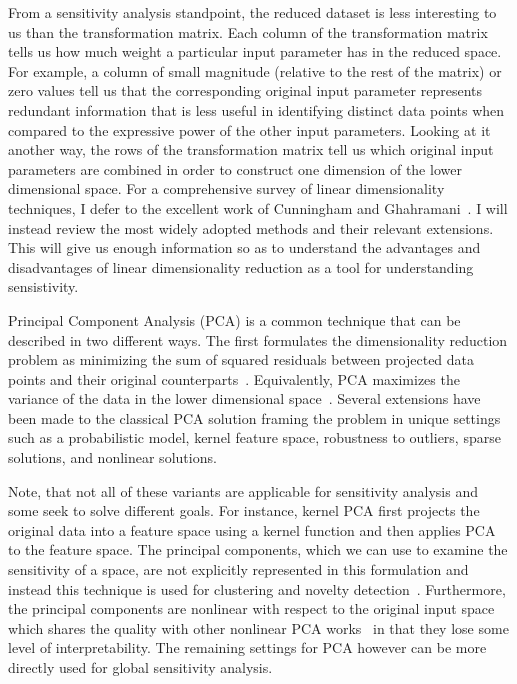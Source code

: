 From a sensitivity analysis standpoint, the reduced dataset is less interesting to us than the transformation matrix.
%
Each column of the transformation matrix tells us how much weight a particular input parameter has in the reduced space.
%
For example, a column of small magnitude (relative to the rest of the matrix) or zero values tell us that the corresponding original input parameter represents redundant information that is less useful in identifying distinct data points when compared to the expressive power of the other input parameters.
%
Looking at it another way, the rows of the transformation matrix tell us which original input parameters are combined in order to construct one dimension of the lower dimensional space.
%
For a comprehensive survey of linear dimensionality techniques, I defer to the excellent work of Cunningham and Ghahramani~\cite{CunninghamGhahramani2015}.
%
I will instead review the most widely adopted methods and their relevant extensions.
%
This will give us enough information so as to understand the advantages and disadvantages of linear dimensionality reduction as a tool for understanding sensistivity.

Principal Component Analysis (PCA) is a common technique that can be described in two different ways.
%
The first formulates the dimensionality reduction problem as minimizing the sum of squared residuals between projected data points and their original counterparts~\cite{Pearson1901}.
%
Equivalently, PCA maximizes the variance of the data in the lower dimensional space~\cite{Hotelling1933}.
%
Several extensions have been made to the classical PCA solution framing the problem in unique settings such as a probabilistic model, kernel feature space, robustness to outliers, sparse solutions, and nonlinear solutions.

Note, that not all of these variants are applicable for sensitivity analysis and some seek to solve different goals.
%
For instance, kernel PCA first projects the original data into a feature space using a kernel function and then applies PCA to the feature space.
%
The principal components, which we can use to examine the sensitivity of a space, are not explicitly represented in this formulation and instead this technique is used for clustering and novelty detection~\cite{ScholkopfSmolaMuller1997}.
%
Furthermore, the principal components are nonlinear with respect to the original input space~\cite{BishopNasrabadi2006} which shares the quality with other nonlinear PCA works~\cite{CollinsDasguptaSchapire2001,MohamedGhahramaniHeller2009,HyvarinenKarhunenOja2001} in that they lose some level of interpretability.
%
The remaining settings for PCA however can be more directly used for global sensitivity analysis.

